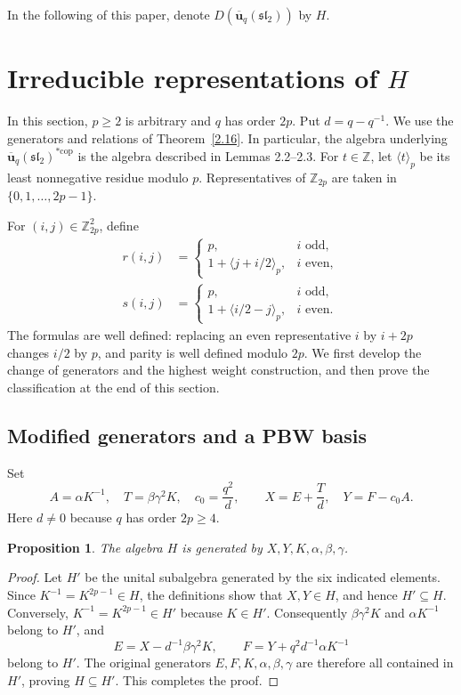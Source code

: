 \documentclass[10pt,oneside]{amsart}
\newcommand{\uq}{\mathbf{\overline{u}}_q(\mathfrak{sl_2})}
\newcommand{\Z}{\mathbb Z}
\newcommand{\res}[1]{\langle #1\rangle_p}
\newcommand{\cop}{\mathrm{cop}}
\newtheorem{proposition}{Proposition}[section]
\theoremstyle{definition}
\newcommand{\selabel}[1]{\label{se:#1}}
\begin{document}
In the following of this paper, denote $D(\uq)$ by $H$.
\section{Irreducible representations of $H$}\selabel{4}
In this section, $p\ge2$ is arbitrary and $q$ has order $2p$. Put
$d=q-q^{-1}$.
We use the generators and relations of Theorem~\ref{2.16}. In particular, the algebra underlying $\uq^{*\cop}$ is the algebra described in Lemmas 2.2--2.3. For $t\in\Z$, let $\res t$ be its least nonnegative residue modulo $p$. Representatives of $\Z_{2p}$ are taken in $\{0,1,\ldots,2p-1\}$.

For $(i,j)\in\Z_{2p}^2$, define
\begin{align}
 r(i,j)&=\begin{cases}p,&i\text{ odd},\\1+\res{j+i/2},&i\text{ even},\end{cases}\label{eq:r}\\
 s(i,j)&=\begin{cases}p,&i\text{ odd},\\1+\res{i/2-j},&i\text{ even}.\end{cases}\label{eq:s}
\end{align}
The formulas are well defined: replacing an even representative $i$ by $i+2p$ changes $i/2$ by $p$, and parity is well defined modulo $2p$. We first develop the change of generators and the highest weight construction, and then prove the classification at the end of this section.

\subsection{Modified generators and a PBW basis}
Set
\begin{equation}
 A=\alpha K^{-1},\quad T=\beta\gamma^2K,\quad c_0=\frac{q^2}{d},
 \qquad X=E+\frac Td,\quad Y=F-c_0A.
 \label{eq:change}
\end{equation}
Here $d\ne0$ because $q$ has order $2p\ge4$.
\begin{proposition}\label{prop:generators}
The algebra $H$ is generated by $X,Y,K,\alpha,\beta,\gamma$.
\end{proposition}
\begin{proof}
Let $H'$ be the unital subalgebra generated by the six indicated elements. Since $K^{-1}=K^{2p-1}\in H$, the definitions show that $X,Y\in H$, and hence $H'\subseteq H$. Conversely, $K^{-1}=K^{2p-1}\in H'$ because $K\in H'$. Consequently $\beta\gamma^2K$ and $\alpha K^{-1}$ belong to $H'$, and
\begin{equation}
 E=X-d^{-1}\beta\gamma^2K,\qquad
 F=Y+q^2d^{-1}\alpha K^{-1}
 \label{eq:recover}
\end{equation}
belong to $H'$. The original generators $E,F,K,\alpha,\beta,\gamma$ are therefore all contained in $H'$, proving $H\subseteq H'$. This completes the proof.
\end{proof}
\end{document}

